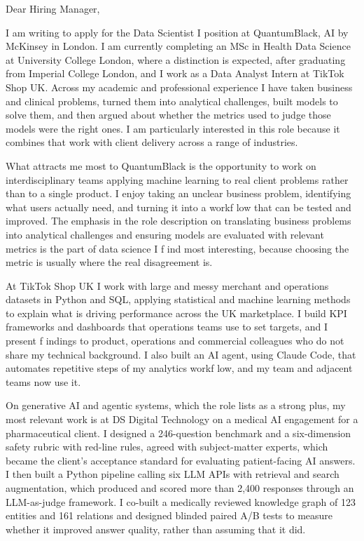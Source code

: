 \documentclass[letterpaper,11pt]{article}
\begin{document}
Dear Hiring Manager,

I am writing to apply for the Data Scientist I position at QuantumBlack, AI by McKinsey in London. I am currently completing an MSc in Health Data Science at University College London, where a distinction is expected, after graduating from Imperial College London, and I work as a Data Analyst Intern at TikTok Shop UK. Across my academic and professional experience I have taken business and clinical problems, turned them into analytical challenges, built models to solve them, and then argued about whether the metrics used to judge those models were the right ones. I am particularly interested in this role because it combines that work with client delivery across a range of industries.

What attracts me most to QuantumBlack is the opportunity to work on interdisciplinary teams applying machine learning to real client problems rather than to a single product. I enjoy taking an unclear business problem, identifying what users actually need, and turning it into a workf\kern0pt low that can be tested and improved. The emphasis in the role description on translating business problems into analytical challenges and ensuring models are evaluated with relevant metrics is the part of data science I f\kern0pt ind most interesting, because choosing the metric is usually where the real disagreement is.

At TikTok Shop UK I work with large and messy merchant and operations datasets in Python and SQL, applying statistical and machine learning methods to explain what is driving performance across the UK marketplace. I build KPI frameworks and dashboards that operations teams use to set targets, and I present f\kern0pt indings to product, operations and commercial colleagues who do not share my technical background. I also built an AI agent, using Claude Code, that automates repetitive steps of my analytics workf\kern0pt low, and my team and adjacent teams now use it.

On generative AI and agentic systems, which the role lists as a strong plus, my most relevant work is at DS Digital Technology on a medical AI engagement for a pharmaceutical client. I designed a 246-question benchmark and a six-dimension safety rubric with red-line rules, agreed with subject-matter experts, which became the client's acceptance standard for evaluating patient-facing AI answers. I then built a Python pipeline calling six LLM APIs with retrieval and search augmentation, which produced and scored more than 2,400 responses through an LLM-as-judge framework. I co-built a medically reviewed knowledge graph of 123 entities and 161 relations and designed blinded paired A/B tests to measure whether it improved answer quality, rather than assuming that it did.
\end{document}
